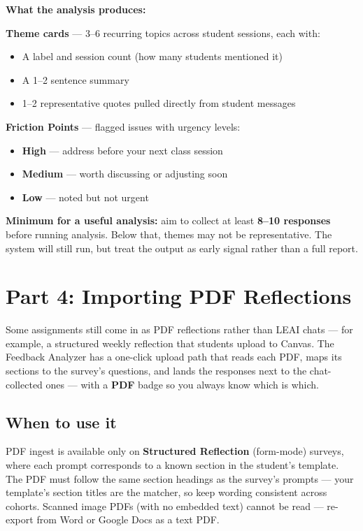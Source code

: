 \documentclass[11pt, letterpaper]{article}
\begin{document}
\textbf{What the analysis produces:}

\textbf{Theme cards} --- 3--6 recurring topics across student sessions, each with:
\begin{itemize}[nosep]
    \item A label and session count (how many students mentioned it)
    \item A 1--2 sentence summary
    \item 1--2 representative quotes pulled directly from student messages
\end{itemize}

\textbf{Friction Points} --- flagged issues with urgency levels:
\begin{itemize}[nosep]
    \item {\color{urgentred}\textbf{High}} --- address before your next class session
    \item {\color{urgentamber}\textbf{Medium}} --- worth discussing or adjusting soon
    \item {\color{urgentgreen}\textbf{Low}} --- noted but not urgent
\end{itemize}

\begin{tipbox}
\textbf{Minimum for a useful analysis:} aim to collect at least \textbf{8--10 responses} before running analysis. Below that, themes may not be representative. The system will still run, but treat the output as early signal rather than a full report.
\end{tipbox}

\section{Part 4: Importing PDF Reflections}

Some assignments still come in as PDF reflections rather than LEAI chats --- for example, a structured weekly reflection that students upload to Canvas. The Feedback Analyzer has a one-click upload path that reads each PDF, maps its sections to the survey's questions, and lands the responses next to the chat-collected ones --- with a \textbf{PDF} badge so you always know which is which.

\subsection{When to use it}

PDF ingest is available only on \textbf{Structured Reflection} (form-mode) surveys, where each prompt corresponds to a known section in the student's template. The PDF must follow the same section headings as the survey's prompts --- your template's section titles are the matcher, so keep wording consistent across cohorts. Scanned image PDFs (with no embedded text) cannot be read --- re-export from Word or Google Docs as a text PDF.
\end{document}
